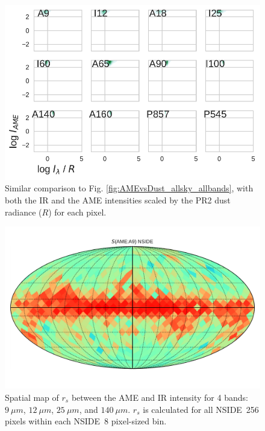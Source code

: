      \begin{figure}
        \includegraphics[width=\textwidth]{../Plots/AMEvsDust_allsky_allbands__mpsub_Rnorm_kde.pdf}
        \centering
        \caption{Similar comparison to Fig. \ref{fig:AMEvsDust_allsky_allbands}, with both the IR and the AME intensities scaled by the PR2 dust radiance ($R$) for each pixel. }
        \label{fig:AMEtoRvsDusttoR_allsky_allbands}
      \end{figure}

      \begin{figure}
        \includegraphics[width=\textwidth]{../Plots/Allsky_Corr/Spearman_Map_nside8_AMEtoA9.pdf}
        \centering
        \caption{Spatial map of $r_{s}$ between the AME and IR intensity for 4 bands:$9~\mu{}m$, $12~\mu{}m$, $25~\mu{}m$, and $140~\mu{}m$. $r_{s}$ is calculated for all NSIDE~256 pixels within each NSIDE~8 pixel-sized bin.}
        \label{fig:Spearman_Map_nside8_AMEtoIR}
      \end{figure}

